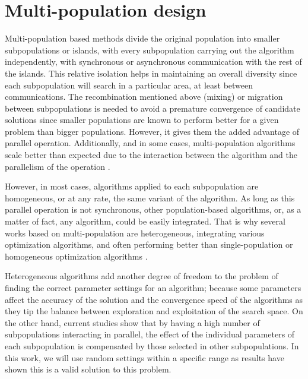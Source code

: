 \documentclass[review]{elsarticle}
\begin{document}
\section{Multi-population design} %

Multi-population based methods divide the original population into
smaller subpopulations or islands, with every subpopulation carrying out the
algorithm independently, with synchronous or asynchronous communication with the
rest of the islands. %
This relative isolation helps in maintaining an overall
diversity since each subpopulation will search in a particular area, at least
between communications. The recombination mentioned above (mixing) or migration
between subpopulations is needed to avoid a premature convergence of candidate
solutions since smaller populations are known to perform better for a given
problem than bigger populations. %
However, it gives them the added advantage of
parallel operation. Additionally, and in some cases, multi-population algorithms
scale better than expected due to the interaction between the algorithm and the
parallelism of the operation \cite{ALBA20027}. %

However, in most cases, algorithms applied to each subpopulation are
homogeneous, or at any rate, the same variant of the algorithm. As long as this
parallel operation is not synchronous, other population-based algorithms, or, as
a matter of fact, any algorithm, could be easily integrated. That is why several
works based on multi-population are heterogeneous, integrating various
optimization algorithms, and often performing better than single-population or
homogeneous optimization algorithms \cite{wu2016differential,nseef2016adaptive}.

Heterogeneous algorithms add another degree of freedom to the problem of finding
the correct parameter settings for an algorithm; because some parameters affect
the accuracy of the solution and the convergence speed of the algorithms as they
tip the balance between exploration and exploitation of the search space. On the
other hand, current studies show that by having a high number of subpopulations
interacting in parallel, the effect of the individual parameters of each
subpopulation is compensated by those selected in other
subpopulations. %
In this
work, we will use random settings within a specific range as results have shown
this is a valid solution to this problem. %
\end{document}
